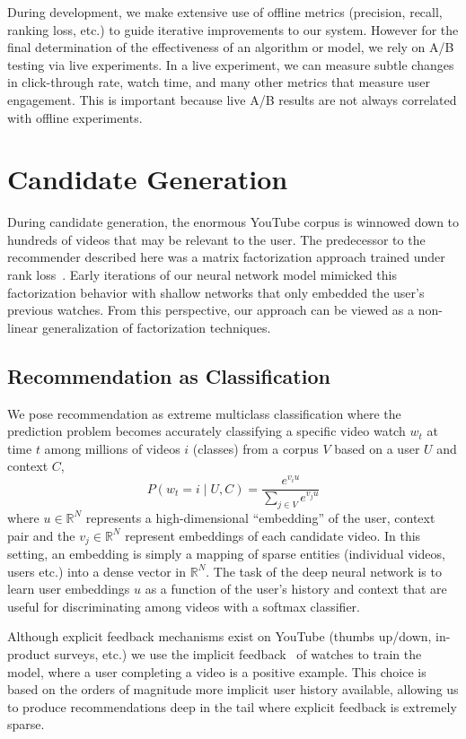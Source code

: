 During development, we make extensive use of offline metrics (precision,
recall, ranking loss, etc.) to guide iterative improvements to our system.
However for the final determination of the effectiveness of an algorithm or
model, we rely on A/B testing via live experiments. In a live experiment, we
can measure subtle changes in click-through rate, watch time, and many other
metrics that measure user engagement. This is important because live A/B
results are not always correlated with offline experiments.

\section{Candidate Generation}

During candidate generation, the enormous YouTube corpus is winnowed down to
hundreds of videos that may be relevant to the user. The predecessor to the
recommender described here was a matrix factorization approach trained under
rank loss~\cite{weston2011wsabie}. Early iterations of our neural network
model mimicked this factorization behavior with shallow networks that only
embedded the user's previous watches. From this perspective, our approach
can be viewed as a non-linear generalization of factorization techniques.

\subsection{Recommendation as Classification}

We pose recommendation as extreme multiclass classification where the
prediction problem becomes accurately classifying a specific video watch
$w_t$ at time $t$ among millions of videos $i$ (classes) from a corpus $V$
based on a user $U$ and context $C$,
\[
  P(w_t = i \mid U, C) = \frac{e^{v_i u}}{\sum_{j \in V} e^{v_j u}}
\]
where $u \in \mathbb{R}^N$ represents a high-dimensional ``embedding'' of the
user, context pair and the $v_j \in \mathbb{R}^N$ represent embeddings of
each candidate video. In this setting, an embedding is simply a mapping of
sparse entities (individual videos, users etc.) into a dense vector in
$\mathbb{R}^N$. The task of the deep neural network is to learn user
embeddings $u$ as a function of the user's history and context that are
useful for discriminating among videos with a softmax classifier.

Although explicit feedback mechanisms exist on YouTube (thumbs up/down,
in-product surveys, etc.) we use the implicit feedback~\cite{oard1998implicit}
of watches to train the model, where a user completing a video is a positive
example. This choice is based on the orders of magnitude more implicit user
history available, allowing us to produce recommendations deep in the tail
where explicit feedback is extremely sparse.

